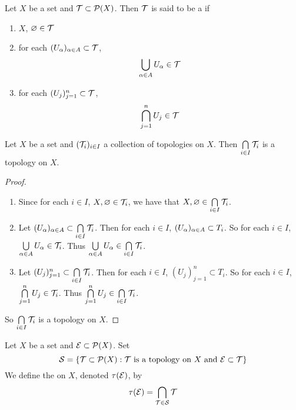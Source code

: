 \documentclass{book}
\begin{document}
	\begin{defn} 
	Let $X$ be a set and $\mathcal{T} \subset \mathcal{P}(X)$. Then $\mathcal{T}$ is said to be a  if 
	\begin{enumerate}
	\item $X$, $\varnothing \in \mathcal{T}$ 
	\item for each $(U_{\alpha})_{\alpha \in A} \subset \mathcal{T}$, $$\bigcup_{\alpha \in A}U_{\alpha} \in \mathcal{T}$$
	\item for each $(U_j)_{j=1}^n \subset \mathcal{T}$, $$\bigcap_{j=1}^n U_{j} \in \mathcal{T}$$
	\end{enumerate}
	\end{defn}		
	
	\begin{ex}  
		Let $X$ be a set and $(\mathcal{T}_{i})_{i \in I}$ a collection of topologies on $X$. Then $\bigcap\limits_{i \in I}\mathcal{T}_i$ is a topology on $X$.
	\end{ex}
	
	\begin{proof}\
	\begin{enumerate}
	\item Since for each $i \in I$, $X, \varnothing \in \mathcal{T}_{i}$, we have that $X, \varnothing \in \bigcap\limits_{i \in I}\mathcal{T}_i$.
	\item Let $(U_{\alpha})_{\alpha \in A} \subset \bigcap\limits_{i \in I}\mathcal{T}_i$. Then for each $i \in I$, $(U_{\alpha})_{\alpha \in A} \subset T_i$. So for each $i \in I$, $\bigcup\limits_{\alpha \in A}U_{\alpha} \in \mathcal{T}_i$. Thus $\bigcup\limits_{\alpha \in A}U_{\alpha} \in \bigcap\limits_{i \in I}\mathcal{T}_i$.
	\item Let $(U_{j})_{j=1}^n \subset \bigcap\limits_{i \in I}\mathcal{T}_i$. Then for each $i \in I$, $(U_{j})_{j=1}^n \subset T_i$. So for each $i \in I$, $\bigcap\limits_{j=1}^n U_{j} \in \mathcal{T}_i$. Thus $\bigcap\limits_{j=1}^n U_{j} \in \bigcap\limits_{i \in I}\mathcal{T}_i$.
	\end{enumerate}
	So $\bigcap\limits_{i \in I}\mathcal{T}_i$ is a topology on $X$.
	\end{proof}
	
	\begin{defn} 
	Let $X$ be a set and $\mathcal{E} \subset \mathcal{P}(X)$. Set 
	\begin{equation*}
	\mathcal{S} = \{\mathcal{T} \subset \mathcal{P}(X): \mathcal{T} \text{ is a topology 	on $X$ and $\mathcal{E} \subset \mathcal{T}$}\}
	\end{equation*}	 
We define the  on $X$, denoted $\tau(\mathcal{E})$, by $$\tau(\mathcal{E}) = \bigcap_{\mathcal{T} \in \mathcal{S}} \mathcal{T}$$
	\end{defn}
\end{document}
